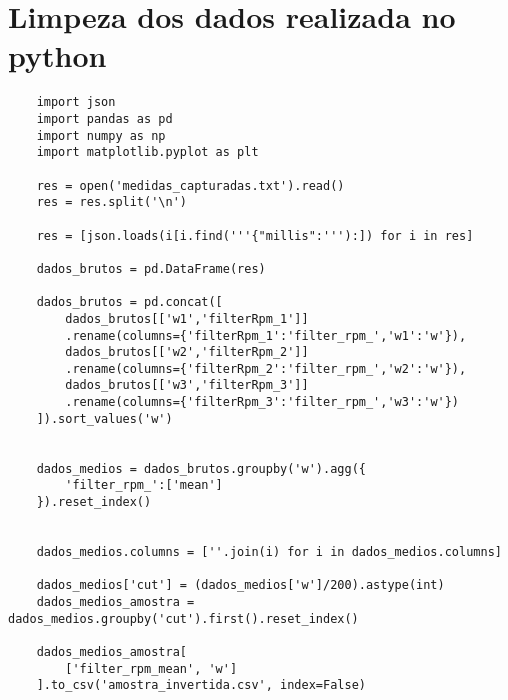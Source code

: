 \chapter{Limpeza dos dados realizada no python}
\label{att_limpeza_python}


\lstset{language=Python}
\begin{lstlisting}
    import json
    import pandas as pd
    import numpy as np
    import matplotlib.pyplot as plt
    
    res = open('medidas_capturadas.txt').read()
    res = res.split('\n')
    
    res = [json.loads(i[i.find('''{"millis":'''):]) for i in res]
    
    dados_brutos = pd.DataFrame(res)
    
    dados_brutos = pd.concat([
        dados_brutos[['w1','filterRpm_1']]
        .rename(columns={'filterRpm_1':'filter_rpm_','w1':'w'}),
        dados_brutos[['w2','filterRpm_2']]
        .rename(columns={'filterRpm_2':'filter_rpm_','w2':'w'}),
        dados_brutos[['w3','filterRpm_3']]
        .rename(columns={'filterRpm_3':'filter_rpm_','w3':'w'})
    ]).sort_values('w')
    
    
    dados_medios = dados_brutos.groupby('w').agg({
        'filter_rpm_':['mean']
    }).reset_index()
    
    
    dados_medios.columns = [''.join(i) for i in dados_medios.columns]
    
    dados_medios['cut'] = (dados_medios['w']/200).astype(int)
    dados_medios_amostra = dados_medios.groupby('cut').first().reset_index()
    
    dados_medios_amostra[
        ['filter_rpm_mean', 'w']
    ].to_csv('amostra_invertida.csv', index=False)

\end{lstlisting}
